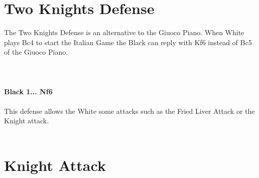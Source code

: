 \documentclass{article}
\begin{document}
\section{ Two Knights Defense}

The Two Knights Defense is an alternative to the Giuoco Piano. When White plays Bc4 to start the Italian Game the Black can reply with Kf6 instead of Bc5 of the Giuoco Piano.\\
\\

\\
\\
\textbf{Black 1... Nf6}\\
\\
This defense allows the White some attacks such as the Fried Liver Attack or the Knight attack.\\
\\
\section{ Knight Attack}
\end{document}
